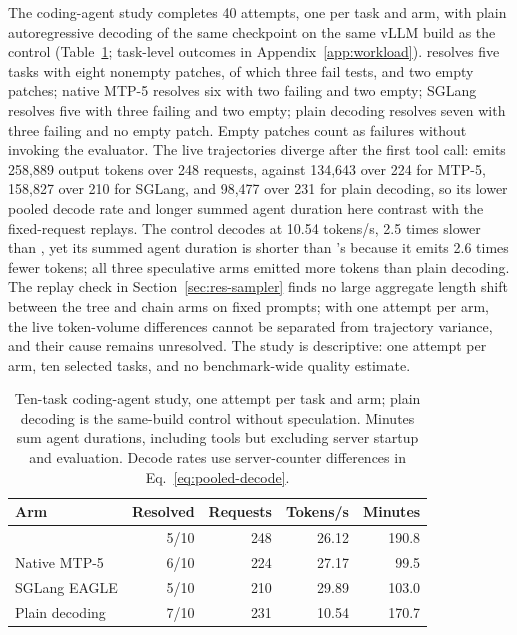 The coding-agent study completes 40 attempts, one per task and arm, with plain autoregressive decoding of the same checkpoint on the same vLLM build as the control (Table~\ref{tab:agent-study}; task-level outcomes in Appendix~\ref{app:workload}). \sys{} resolves five tasks with eight nonempty patches, of which three fail tests, and two empty patches; native MTP-5 resolves six with two failing and two empty; SGLang resolves five with three failing and two empty; plain decoding resolves seven with three failing and no empty patch. Empty patches count as failures without invoking the evaluator. The live trajectories diverge after the first tool call: \sys{} emits 258,889 output tokens over 248 requests, against 134,643 over 224 for MTP-5, 158,827 over 210 for SGLang, and 98,477 over 231 for plain decoding, so its lower pooled decode rate and longer summed agent duration here contrast with the fixed-request replays. The control decodes at 10.54 tokens/s, 2.5 times slower than \sys{}, yet its summed agent duration is shorter than \sys{}'s because it emits 2.6 times fewer tokens; all three speculative arms emitted more tokens than plain decoding. The replay check in Section~\ref{sec:res-sampler} finds no large aggregate length shift between the tree and chain arms on fixed prompts; with one attempt per arm, the live token-volume differences cannot be separated from trajectory variance, and their cause remains unresolved. The study is descriptive: one attempt per arm, ten selected tasks, and no benchmark-wide quality estimate.

\begin{table}[t]
\caption{Ten-task coding-agent study, one attempt per task and arm; plain decoding is the same-build control without speculation. Minutes sum agent durations, including tools but excluding server startup and evaluation. Decode rates use server-counter differences in Eq.~\ref{eq:pooled-decode}.}
\label{tab:agent-study}
\centering\small
\setlength{\tabcolsep}{3pt}
\begin{tabular}{@{}lrrrr@{}}
\toprule
Arm & Resolved & Requests & Tokens/s & Minutes \\
\midrule
\sys{} & 5/10 & 248 & 26.12 & 190.8 \\
Native MTP-5 & 6/10 & 224 & 27.17 & 99.5 \\
SGLang EAGLE & 5/10 & 210 & 29.89 & 103.0 \\
Plain decoding & 7/10 & 231 & 10.54 & 170.7 \\
\bottomrule
\end{tabular}
\end{table}
